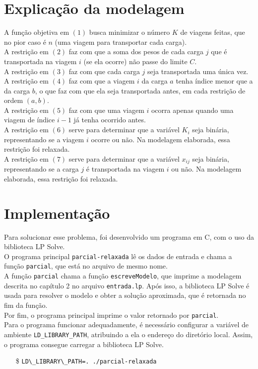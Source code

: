 \documentclass{article}
\begin{document}
\newpage
\section{Explicação da modelagem}
A função objetiva em $(1)$ busca minimizar o número $K$ de viagens feitas, que no pior caso é $n$ (uma viagem para transportar cada carga).\\
A restrição em $(2)$ faz com que a soma dos pesos de cada carga $j$ que é transportada na viagem $i$ (se ela ocorre) não passe do limite $C$.\\
A restrição em $(3)$ faz com que cada carga $j$ seja transportada uma única vez.\\
A restrição em $(4)$ faz com que a viagem $i$ da carga $a$ tenha índice menor que a da carga $b$, o que faz com que ela seja transportada antes, em cada restrição de ordem $(a, b)$.\\
A restrição em $(5)$ faz com que uma viagem $i$ ocorra apenas quando uma viagem de índice $i-1$ já tenha ocorrido antes.\\
A restrição em $(6)$ serve para determinar que a variável $K_i$ seja binária, representando se a viagem $i$ ocorre ou não. Na modelagem elaborada, essa restrição foi relaxada.\\
A restrição em $(7)$ serve para determinar que a variável $x_{ij}$ seja binária, representando se a carga $j$ é transportada na viagem $i$ ou não. Na modelagem elaborada, essa restrição foi relaxada.

\newpage
\section{Implementação}
Para solucionar esse problema, foi desenvolvido um programa em C, com o uso da biblioteca LP Solve.\\
O programa principal \texttt{parcial-relaxada} lê os dados de entrada e chama a função \texttt{parcial}, que está no arquivo de mesmo nome.\\
A função \texttt{parcial} chama a função \texttt{escreveModelo}, que imprime a modelagem descrita no capítulo 2 no arquivo \texttt{entrada.lp}. Após isso, a biblioteca LP Solve é usada para resolver o modelo e obter a solução aproximada, que é retornada no fim da função.\\
Por fim, o programa principal imprime o valor retornado por \texttt{parcial}.\\
Para o programa funcionar adequadamente, é necessário configurar a variável de ambiente \texttt{LD\_LIBRARY\_PATH}, atribuindo a ela o endereço do diretório local. Assim, o programa consegue carregar a biblioteca LP Solve.
\begin{enumerate}
    \item[\$] \verb|LD\_LIBRARY\_PATH=. ./parcial-relaxada|
\end{enumerate}
\end{document}
